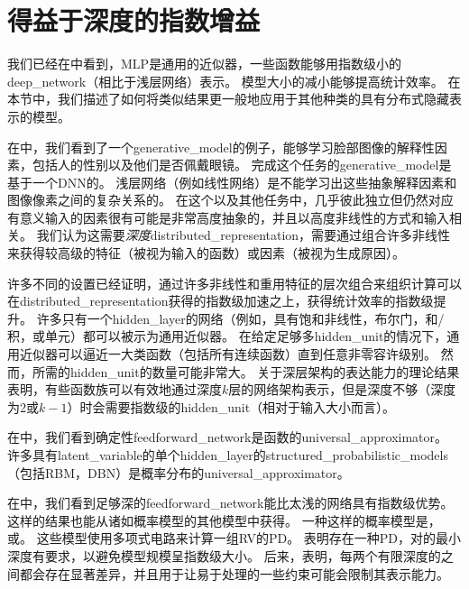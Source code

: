 \section{得益于深度的指数增益}
\label{sec:exponential_gains_from_depth}
我们已经在中看到，\gls{MLP}是通用的近似器，一些函数能够用指数级小的\gls{deep_network}（相比于浅层网络）表示。
模型大小的减小能够提高统计效率。
在本节中，我们描述了如何将类似结果更一般地应用于其他种类的具有分布式隐藏表示的模型。


在中，我们看到了一个\gls{generative_model}的例子，能够学习脸部图像的解释性因素，包括人的性别以及他们是否佩戴眼镜。
完成这个任务的\gls{generative_model}是基于一个\gls{DNN}的。
浅层网络（例如线性网络）是不能学习出这些抽象解释因素和图像像素之间的复杂关系的。
在这个以及其他任务中，几乎彼此独立但仍然对应有意义输入的因素很有可能是非常高度抽象的，并且以高度非线性的方式和输入相关。
我们认为这需要\emph{深度}\gls{distributed_representation}，需要通过组合许多非线性来获得较高级的特征（被视为输入的函数）或因素（被视为生成原因）。


许多不同的设置已经证明，通过许多非线性和重用特征的层次组合来组织计算可以在\gls{distributed_representation}获得的指数级加速之上，获得统计效率的指数级提升。
许多只有一个\gls{hidden_layer}的网络（例如，具有饱和非线性，布尔门，和/积，或单元）都可以被示为通用近似器。
在给定足够多\gls{hidden_unit}的情况下，通用近似器可以逼近一大类函数（包括所有连续函数）直到任意非零容许级别。
然而，所需的\gls{hidden_unit}的数量可能非常大。
关于深层架构的表达能力的理论结果表明，有些函数族可以有效地通过深度$k$层的网络架构表示，但是深度不够（深度为2或$k-1$）时会需要指数级的\gls{hidden_unit}（相对于输入大小而言）。


在中，我们看到确定性\gls{feedforward_network}是函数的\gls{universal_approximator}。
许多具有\gls{latent_variable}的单个\gls{hidden_layer}的\gls{structured_probabilistic_models}（包括\gls{RBM}，\gls{DBN}）是概率分布的\gls{universal_approximator}\citep{LeRoux-Bengio-2007-TR,Montufar-2011,Montufar-et-al-NIPS2014,Krause-et-al-ICML2013}。


在中，我们看到足够深的\gls{feedforward_network}能比太浅的网络具有指数级优势。
这样的结果也能从诸如概率模型的其他模型中获得。
一种这样的概率模型是，或\citep{Poon+Domingos-2011}。
这些模型使用多项式电路来计算一组\gls{RV}的\gls{PD}。
\cite{Delalleau+Bengio-2011-small}表明存在一种\gls{PD}，对的最小深度有要求，以避免模型规模呈指数级大小。
后来，\cite{Martens+Medabalimi-arxiv2014}表明，每两个有限深度的之间都会存在显著差异，并且用于让易于处理的一些约束可能会限制其表示能力。


